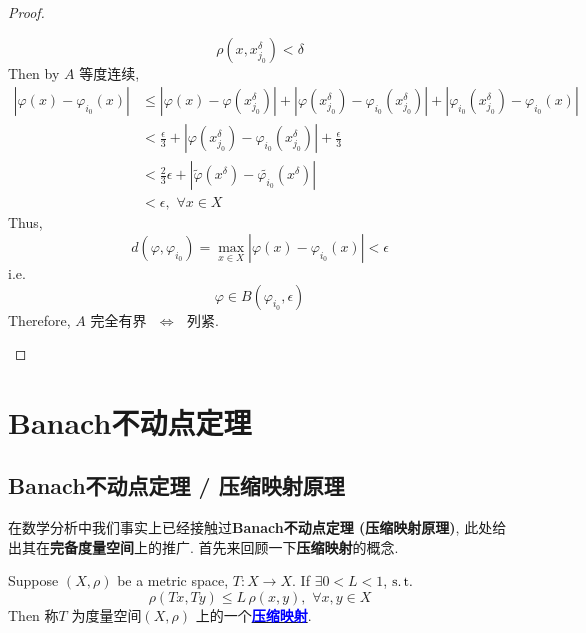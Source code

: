 \begin{thm}
\begin{proof}
\begin{enumerate}
				\[ \rho(x , x_{j_0}^\delta) < \delta \]
				Then by $A$ 等度连续, 
				\begin{align}
					\left| \varphi(x) - \varphi_{i_0}(x) \right| 
					&\leq \left| \varphi(x) - \varphi(x_{j_0}^\delta) \right| + \left| \varphi(x_{j_0}^\delta) - \varphi_{i_0}(x_{j_0}^\delta) \right| + \left| \varphi_{i_0}(x_{j_0}^\delta) - \varphi_{i_0}(x) \right| \\
					&< \frac{\epsilon}{3} + \left| \varphi(x_{j_0}^\delta) - \varphi_{i_0}(x_{j_0}^\delta) \right| + \frac{\epsilon}{3} \\
					&< \frac{2}{3} \epsilon + \left| \widetilde{\varphi}(x^\delta) - \widetilde{\varphi_{i_0}}(x^\delta) \right| \\
					&< \epsilon , \,\, \forall x \in X
				\end{align}
				Thus, 
				\[ d(\varphi , \varphi_{i_0}) = \max_{x \in X} \left| \varphi(x) - \varphi_{i_0}(x) \right| < \epsilon \]
				i.e.
				\[ \varphi \in B(\varphi_{i_0} , \epsilon) \]
				Therefore, $A$ 完全有界 $\,\, \Leftrightarrow \,\,$ 列紧.
			\end{enumerate}
		\end{proof}
	\end{thm}

\newpage

\section{Banach不动点定理}
\subsection{Banach不动点定理 / 压缩映射原理}
	在数学分析中我们事实上已经接触过\textbf{Banach不动点定理 (压缩映射原理)}, 此处给出其在\textbf{完备度量空间}上的推广. 首先来回顾一下\textbf{压缩映射}的概念.
	
	\begin{defn}\label{def 1.9.1}
		Suppose $(X , \rho)$ be a metric space, $T : X \longrightarrow X$. If $\exists 0 < L <1$, $\operatorname{s.t.}$
		\[ \rho(Tx , Ty) \leq L \, \rho(x , y) , \,\, \forall x , y \in X \]
		Then 称$T$ 为度量空间$(X , \rho)$ 上的一个\underline{\textcolor{blue}{\textbf{压缩映射}}}.
	\end{defn}
	
	\vspace{6em}
	
